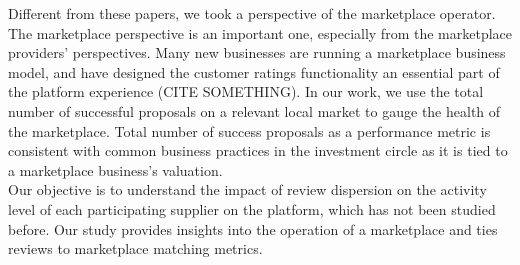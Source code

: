 \documentclass[msom,blindrev]{informs3}
\begin{document}
Different from these papers, we took a perspective of the marketplace operator. The marketplace perspective is an important one, especially from the marketplace providers' perspectives. Many new businesses are running a marketplace business model, and have designed the customer ratings functionality an essential part of the platform experience (CITE SOMETHING). In our work, we use the total number of successful proposals on a relevant local market to gauge the health of the marketplace. Total number of success proposals as a performance metric is consistent with common business practices in the investment circle \citep{boris_2018,galston_2017} as it is tied to a marketplace business's valuation. \\

Our objective is to understand the impact of review dispersion on the activity level of each participating supplier on the platform, which has not been studied before. Our study provides insights into the operation of a marketplace and ties reviews to marketplace matching metrics.
\end{document}
